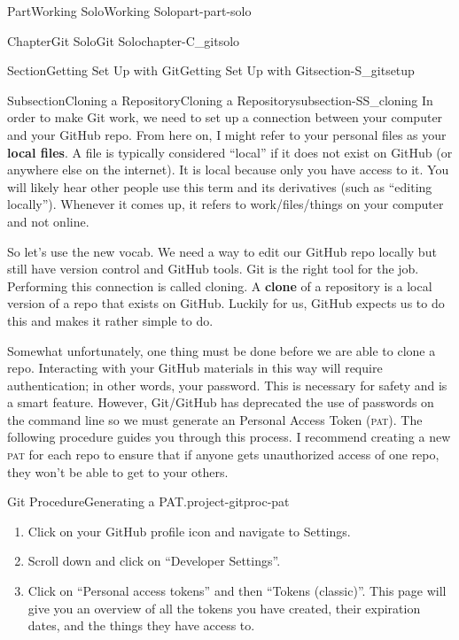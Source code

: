 \documentclass[twoside,10pt,]{book}
\newcommand{\acronym}[1]{\textsc{\MakeLowercase{#1}}}
\DeclareRobustCommand{\acronymintitle}[1]{\texorpdfstring{#1}{#1}}
\newcommand{\terminology}[1]{\textbf{#1}}
\begin{document}
\begin{partptx}{Part}{Working Solo}{}{Working Solo}{}{}{part-part-solo}
\begin{chapterptx}{Chapter}{Git Solo}{}{Git Solo}{}{}{chapter-C_gitsolo}
\begin{sectionptx}{Section}{Getting Set Up with Git}{}{Getting Set Up with Git}{}{}{section-S_gitsetup}
\typeout{************************************************}
%
\begin{subsectionptx}{Subsection}{Cloning a Repository}{}{Cloning a Repository}{}{}{subsection-SS_cloning}
%
%
%
%
%
In order to make Git work, we need to set up a connection between your computer and your GitHub repo. From here on, I might refer to your personal files as your \terminology{local files}. A file is typically considered ``local'' if it does not exist on GitHub (or anywhere else on the internet). It is local because only you have access to it. You will likely hear other people use this term and its derivatives (such as ``editing locally''). Whenever it comes up, it refers to work\slash{}files\slash{}things on your computer and not online.%
\par
So let's use the new vocab. We need a way to edit our GitHub repo locally but still have version control and GitHub tools. Git is the right tool for the job. Performing this connection is called cloning. A \terminology{clone} of a repository is a local version of a repo that exists on GitHub. Luckily for us, GitHub expects us to do this and makes it rather simple to do.%
\par
Somewhat unfortunately, one thing must be done before we are able to clone a repo. Interacting with your GitHub materials in this way will require authentication; in other words, your password. This is necessary for safety and is a smart feature. However, Git\slash{}GitHub has deprecated the use of passwords on the command line so we must generate an Personal Access Token (\acronym{PAT}). The following procedure guides you through this process. I recommend creating a new \acronym{PAT} for each repo to ensure that if anyone gets unauthorized access of one repo, they won't be able to get to your others.%
\begin{project}{Git Procedure}{Generating a \acronymintitle{PAT}.}{project-gitproc-pat}%
\index{github!\acronym{PAT}}%
\begin{enumerate}[font=\bfseries,label=(\alph*),ref=\alph*]%
\item{}Click on your GitHub profile icon and navigate to Settings.%
\item{}Scroll down and click on ``Developer Settings''.%
\item{}Click on ``Personal access tokens'' and then ``Tokens (classic)''. This page will give you an overview of all the tokens you have created, their expiration dates, and the things they have access to.%

\end{enumerate}
\end{project}
\end{subsectionptx}
\end{sectionptx}
\end{chapterptx}
\end{partptx}
\end{document}
